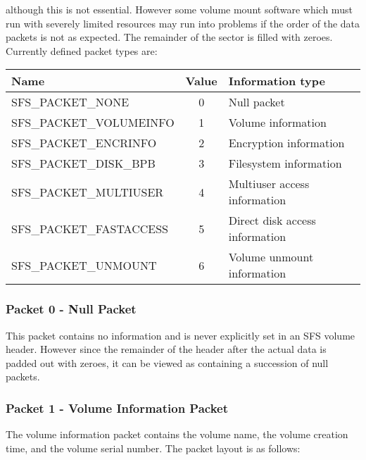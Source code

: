 although this is not essential.  However some volume mount software which must 
run with severely limited resources may run into problems if the order of the 
data packets is not as expected.  The remainder of the sector is filled with 
zeroes.  Currently defined packet types are:

\begin{center}
\begin{tabular}{|l|c|l|}
\hline
    Name                 &   Value  &     Information type\\
\hline
    SFS\_PACKET\_NONE      &     0    &     Null packet\\
    SFS\_PACKET\_VOLUMEINFO&     1    &     Volume information\\
    SFS\_PACKET\_ENCRINFO  &     2    &     Encryption information\\
    SFS\_PACKET\_DISK\_BPB &     3    &     Filesystem information\\
    SFS\_PACKET\_MULTIUSER &     4    &     Multiuser access information\\
    SFS\_PACKET\_FASTACCESS&     5    &     Direct disk access information\\
    SFS\_PACKET\_UNMOUNT   &     6    &     Volume unmount information\\
\hline
\end{tabular}
\end{center}


\subsubsection{Packet 0 - Null Packet}

This packet contains no information and is never explicitly set in an SFS
volume header.  However since the remainder of the header after the actual data
is padded out with zeroes, it can be viewed as containing a succession of null
packets.


\subsubsection{Packet 1 - Volume Information Packet}

The volume information packet contains the volume name, the volume creation
time, and the volume serial number.  The packet layout is as follows:

